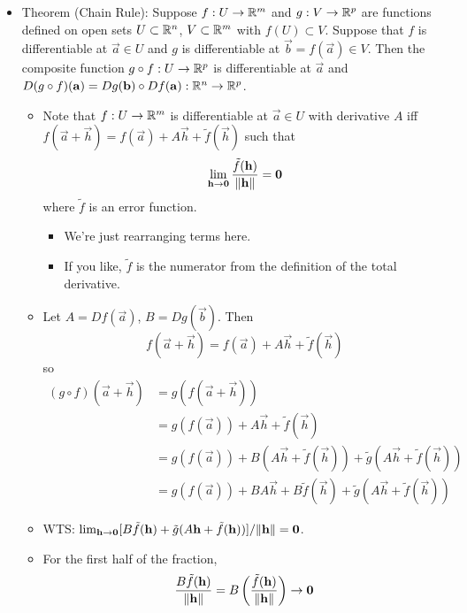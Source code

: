 \documentclass[../notes.tex]{subfiles}
\begin{document}
\begin{itemize}
    \item {}Theorem (Chain Rule): Suppose $f:U\to\mathbb{R}^m$ and $g:V\to\mathbb{R}^p$ are functions defined on open sets $U\subset\mathbb{R}^n$, $V\subset\mathbb{R}^m$ with $f(U)\subset V$. Suppose that $f$ is differentiable at $\vec{a}\in U$ and $g$ is differentiable at $\vec{b}=f(\vec{a})\in V$. Then the composite function $g\circ f:U\to\mathbb{R}^p$ is differentiable at $\vec{a}$ and $D(g\circ f)(\mathbf{a})=Dg(\mathbf{b})\circ Df(\mathbf{a}):\mathbb{R}^n\to\mathbb{R}^p$.
    \begin{itemize}
        \item Note that $f:U\to\mathbb{R}^m$ is differentiable at $\vec{a}\in U$ with derivative $A$ iff $f(\vec{a}+\vec{h})=f(\vec{a})+A\vec{h}+\tilde{f}(\vec{h})$ such that
        \begin{equation*}
            \lim_{\mathbf{h}\to\bm{0}}\frac{\tilde{f}(\mathbf{h})}{\norm{\mathbf{h}}} = \bm{0}
        \end{equation*}
        where $\tilde{f}$ is an error function.
        \begin{itemize}
            \item We're just rearranging terms here.
            \item If you like, $\tilde{f}$ is the numerator from the definition of the total derivative.
        \end{itemize}
        \item Let $A=Df(\vec{a})$, $B=Dg(\vec{b})$. Then
        \begin{equation*}
            f(\vec{a}+\vec{h}) = f(\vec{a})+A\vec{h}+\tilde{f}(\vec{h})
        \end{equation*}
        so
        \begin{align*}
            (g\circ f)(\vec{a}+\vec{h}) &= g(f(\vec{a}+\vec{h}))\\
            &= g(f(\vec{a}))+A\vec{h}+\tilde{f}(\vec{h})\\
            &= g(f(\vec{a}))+B(A\vec{h}+\tilde{f}(\vec{h}))+\tilde{g}(A\vec{h}+\tilde{f}(\vec{h}))\\
            &= g(f(\vec{a}))+BA\vec{h}+B\tilde{f}(\vec{h})+\tilde{g}(A\vec{h}+\tilde{f}(\vec{h}))
        \end{align*}
        \item WTS: $\lim_{\mathbf{h}\to\bm{0}}[B\tilde{f}(\mathbf{h})+\tilde{g}(A\mathbf{h}+\tilde{f}(\mathbf{h}))]/\norm{\mathbf{h}}=\bm{0}$.
        \item For the first half of the fraction,
        \begin{equation*}
            \frac{B\tilde{f}(\vec{h})}{\norm{\vec{h}}} = B\left( \frac{\tilde{f}(\vec{h})}{\norm{\vec{h}}} \right) \to \bm{0}

\end{equation*}
\end{itemize}
\end{itemize}
\end{document}
